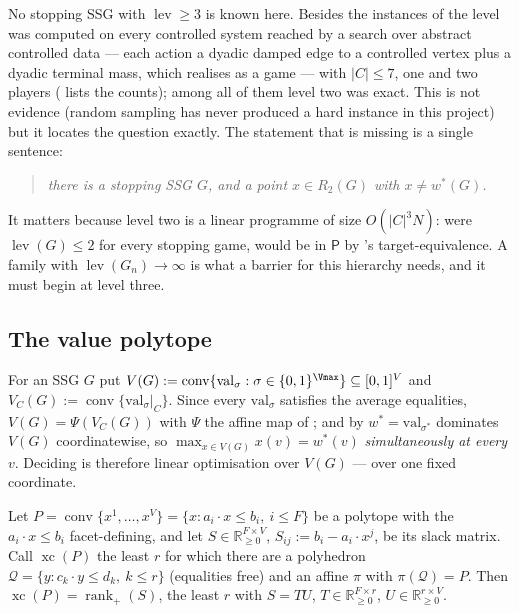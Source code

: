 \begin{remark}\label{xc:frontier}
No stopping SSG with $\operatorname{lev}\ge3$ is known here.  Besides the instances of
 the level was computed on every controlled system reached by a search over
abstract controlled data --- each action a dyadic damped edge to a controlled vertex plus a
dyadic terminal mass, which  realises as a game --- with $|C|\le7$, one
and two players ( lists the counts); among all of them level two was exact.  This is not evidence (random sampling
has never produced a hard instance in this project) but it locates the question exactly.  The
statement that is missing is a single sentence:
\begin{quote}
\emph{there is a stopping SSG $G$, and a point $x\in R_2(G)$ with $x\ne w^{\ast}(G)$.}
\end{quote}
It matters because level two is a linear programme of size $O(|C|^{3}N)$: were
$\operatorname{lev}(G)\le2$ for every stopping game,  would be in $\mathsf P$
by 's target-equivalence.  A family with $\operatorname{lev}(G_n)\to\infty$
is what a barrier for this hierarchy needs, and it must begin at level three.
\end{remark}

\subsection{The value polytope}\label{xc:sec-vpoly}

\begin{definition}\label{xc:def-vpoly}
For an SSG $G$ put $V(G):=\operatorname{conv}\{\mathrm{val}_\sigma:\sigma\in\{0,1\}^{\Vmax}\}
\subseteq[0,1]^{V}$ and $V_C(G):=\operatorname{conv}\{\mathrm{val}_\sigma|_{C}\}$.  Since every
$\mathrm{val}_\sigma$ satisfies the average equalities, $V(G)=\Psi(V_C(G))$ with $\Psi$ the
affine map of ; and by 
$w^{\ast}=\mathrm{val}_{\sigma^{\ast}}$ dominates $V(G)$ coordinatewise, so
$\max_{x\in V(G)}x(v)=w^{\ast}(v)$ \emph{simultaneously at every $v$}.  Deciding
 is therefore linear optimisation over $V(G)$ --- over one fixed coordinate.
\end{definition}

\begin{lemma}\label{xc:yannakakis}
Let $P=\operatorname{conv}\{x^{1},\dots,x^{V}\}=\{x:a_i\!\cdot\!x\le b_i,\ i\le F\}$ be a
polytope with the $a_i\!\cdot\!x\le b_i$ facet-defining, and let $S\in\mathbb R^{F\times
V}_{\ge0}$, $S_{ij}:=b_i-a_i\!\cdot\!x^{j}$, be its slack matrix.  Call
$\operatorname{xc}(P)$ the least $r$ for which there are a polyhedron
$\mathcal Q=\{y:c_k\!\cdot\!y\le d_k,\ k\le r\}$ (equalities free) and an affine $\pi$ with
$\pi(\mathcal Q)=P$.  Then $\operatorname{xc}(P)=\operatorname{rank}_+(S)$, the least $r$ with
$S=TU$, $T\in\mathbb R^{F\times r}_{\ge0}$, $U\in\mathbb R^{r\times V}_{\ge0}$.
\end{lemma}

